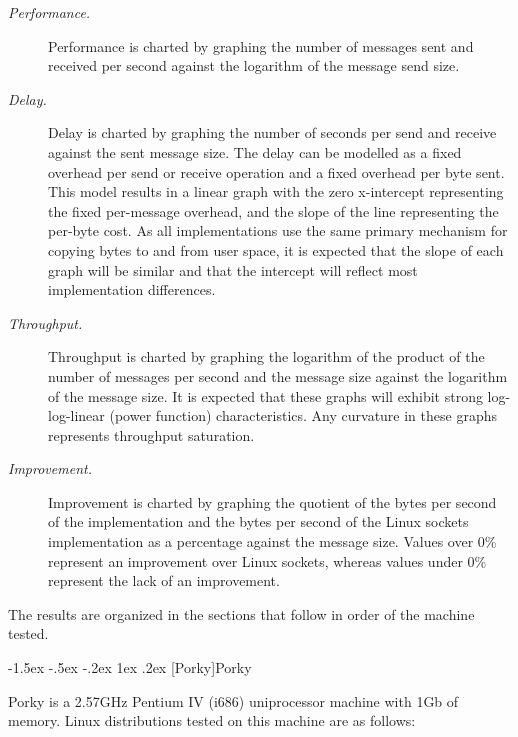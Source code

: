 \documentclass[letterpaper,final,notitlepage,twocolumn,10pt,twoside]{article}
\makeatletter
\renewcommand\subsection{\@startsection{subsection}{2}{\z@}%
                                     {-1.5ex \@plus -.5ex \@minus -.2ex}%
                                     {1ex \@plus .2ex}%
                                     {\normalfont\normalsize\bfseries}}
\makeatother
\begin{document}
\begin{description}

\item[{\it Performance.}]

Performance is charted by graphing the number of messages sent and received per second against the
logarithm of the message send size.

\item[{\it Delay.}]

Delay is charted by graphing the number of seconds per send and receive against the sent message
size.  The delay can be modelled as a fixed overhead per send or receive operation and a fixed
overhead per byte sent.  This model results in a linear graph with the zero x-intercept representing
the fixed per-message overhead, and the slope of the line representing the per-byte cost.  As all
implementations use the same primary mechanism for copying bytes to and from user space, it is
expected that the slope of each graph will be similar and that the intercept will reflect most
implementation differences.

\item[{\it Throughput.}]

Throughput is charted by graphing the logarithm of the product of the number of messages per second
and the message size against the logarithm of the message size.  It is expected that these graphs
will exhibit strong log-log-linear (power function) characteristics.  Any curvature in these graphs
represents throughput saturation.

\item[{\it Improvement.}]

Improvement is charted by graphing the quotient of the bytes per second of the implementation and
the bytes per second of the Linux sockets implementation as a percentage against the message size.
Values over 0\% represent an improvement over Linux sockets, whereas values under 0\% represent the
lack of an improvement.

\end{description}

The results are organized in the sections that follow in order of the machine tested.

\subsection[Porky]{Porky}

Porky is a 2.57GHz Pentium IV (i686) uniprocessor machine with 1Gb of memory.  Linux distributions
tested on this machine are as follows:
\end{document}
